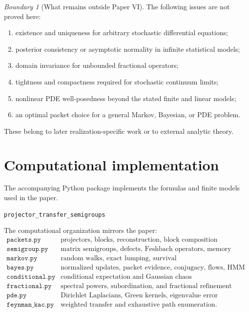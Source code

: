 \documentclass[11pt]{article}
\theoremstyle{definition}
\theoremstyle{remark}
\newtheorem{boundary}[theorem]{Boundary}
\begin{document}
\begin{boundary}[What remains outside Paper VI]
The following issues are not proved here:
\begin{enumerate}[leftmargin=2em]
\item existence and uniqueness for arbitrary stochastic differential equations;
\item posterior consistency or asymptotic normality in infinite statistical models;
\item domain invariance for unbounded fractional operators;
\item tightness and compactness required for stochastic continuum limits;
\item nonlinear PDE well-posedness beyond the stated finite and linear models;
\item an optimal packet choice for a general Markov, Bayesian, or PDE problem.
\end{enumerate}
These belong to later realization-specific work or to external analytic theory.
\end{boundary}

\section{Computational implementation}

The accompanying Python package implements the formulas and finite models used in the paper.
\begin{center}
\texttt{projector\_transfer\_semigroups}
\end{center}
The computational organization mirrors the paper:
\[
\begin{array}{c|l}
\texttt{packets.py} & \text{projectors, blocks, reconstruction, block composition}\\
\texttt{semigroup.py} & \text{matrix semigroups, defects, Feshbach operators, memory}\\
\texttt{markov.py} & \text{random walks, exact lumping, survival}\\
\texttt{bayes.py} & \text{normalized updates, packet evidence, conjugacy, flows, HMM}\\
\texttt{conditional.py} & \text{conditional expectation and Gaussian chaos}\\
\texttt{fractional.py} & \text{spectral powers, subordination, and fractional refinement certificates}\\
\texttt{pde.py} & \text{Dirichlet Laplacians, Green kernels, eigenvalue error}\\
\texttt{feynman\_kac.py} & \text{weighted transfer and exhaustive path enumeration}.
\end{array}
\]
\end{document}
